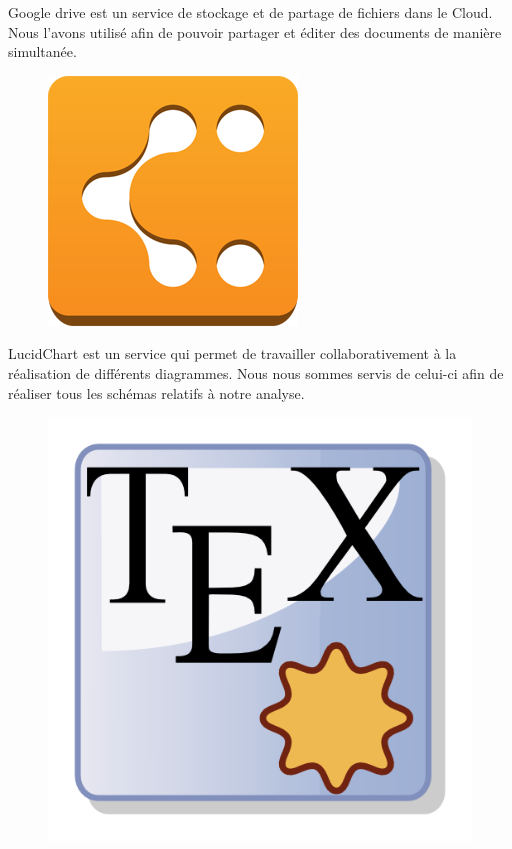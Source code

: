 \documentclass[17pts]{report}
\begin{document}
Google drive est un service de stockage et de partage de fichiers dans le
Cloud. Nous l'avons utilisé afin de pouvoir partager et éditer des documents de
manière simultanée.\\

\begin{figure}[H]
    \includegraphics[scale=0.15]{illustrations/lucidchart.png}
    \centering
\end{figure}

LucidChart est un service qui permet de travailler collaborativement à la
réalisation de différents diagrammes. Nous nous sommes servis de celui-ci afin
de réaliser tous les schémas relatifs à notre analyse.\\

\begin{figure}[H]
    \includegraphics[scale=1.1]{illustrations/texmaker.png}
    \centering
\end{figure}
\end{document}
